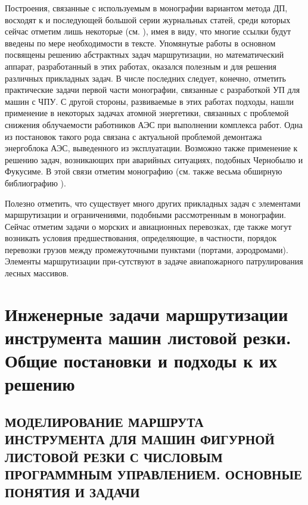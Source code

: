 \documentclass[12pt,twoside]{report}
\begin{document}
Построения, связанные с используемым в монографии
вариантом метода ДП, восходят к
\cite{Cha1`} и последующей большой серии
журнальных статей,
среди которых сейчас отметим лишь некоторые
(см. \cite{Cha8`,intro51,intro52,intro53,intro54,intro55,intro56}),
имея в виду, что многие ссылки будут
введены по мере необходимости в тексте.
Упомянутые работы
\cite{Cha8`,intro51,intro52,intro53,intro54,intro55,intro56}
в основном посвящены решению абстрактных задач маршрутизации,
но математический аппарат, разработанный в этих работах,
оказался полезным и для решения различных прикладных задач.
В числе последних следует, конечно,
отметить практические задачи первой части монографии,
связанные с разработкой УП для машин с ЧПУ.
С другой стороны, развиваемые в этих работах подходы,
нашли применение в некоторых задачах атомной энергетики,
связанных с проблемой снижения облучаемости работников АЭС
при выполнении комплекса работ.
Одна из постановок такого рода связана с
актуальной проблемой демонтажа энергоблока АЭС,
выведенного из эксплуатации.
Возможно также применение к решению задач,
возникающих при аварийных ситуациях,
подобных Чернобылю и Фукусиме.
В этой связи отметим монографию \cite{Cha2`}
(см. также весьма обширную библиографию \cite{Cha2`}).

Полезно отметить, что существует много других прикладных задач
с элементами маршрутизации и ограничениями,
подобными рассмотренным в монографии.
Сейчас отметим задачи о морских и авиационных перевозках,
где также могут возникать условия предшествования,
определяющие, в частности, порядок перевозки грузов
между промежуточными пунктами (портами, аэродромами).
Элементы маршрутизации при-сутствуют в задаче
авиапожарного патрулирования лесных массивов.


\part{Инженерные задачи
маршрутизации инструмента машин листовой резки.
Общие постановки и подходы к их решению}

\chapter{МОДЕЛИРОВАНИЕ МАРШРУТА ИНСТРУМЕНТА ДЛЯ МАШИН ФИГУРНОЙ ЛИСТОВОЙ РЕЗКИ С
ЧИСЛОВЫМ ПРОГРАММНЫМ УПРАВЛЕНИЕМ.
ОСНОВНЫЕ ПОНЯТИЯ И ЗАДАЧИ}
\setcounter{chapter}{1}
\setcounter{equation}{0}
\end{document}
